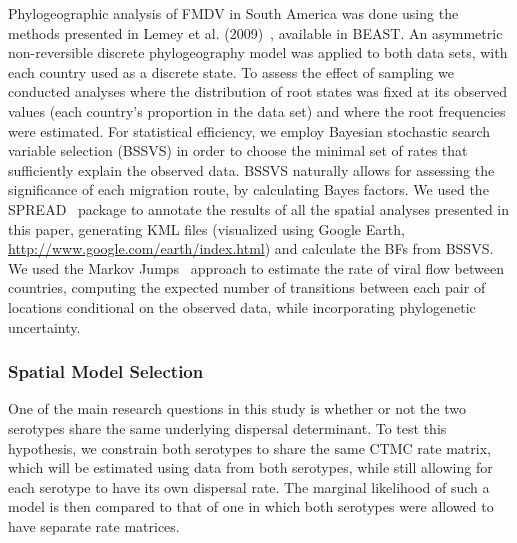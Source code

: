 \documentclass[10pt]{article}
\begin{document}
Phylogeographic analysis of FMDV in South America was done using the methods presented in Lemey et al. (2009)~\cite{roots}, available in BEAST. 
An asymmetric non-reversible discrete phylogeography model was applied to both data sets, with each country used as a discrete state.
To assess the effect of sampling we conducted analyses where the distribution of root states was fixed at its observed values (each country's proportion in the data set) and where the root frequencies were estimated.
For statistical efficiency, we employ Bayesian stochastic search variable selection (BSSVS) in order to choose the minimal set of rates that sufficiently explain the observed data.
BSSVS naturally allows for assessing the significance of each migration route, by calculating Bayes factors.
We used the SPREAD~\cite{spread} package to annotate the results of all the spatial analyses presented in this paper, generating KML files (visualized using Google Earth, \url{http://www.google.com/earth/index.html}) and calculate the BFs from BSSVS.
We used the Markov Jumps~\cite{Minin2008} approach to estimate the rate of viral flow between countries, computing the expected number of transitions between each pair of locations conditional on the observed data, while incorporating phylogenetic uncertainty.

\subsubsection*{Spatial Model Selection}

One of the main research questions in this study is whether or not the two serotypes share the same underlying dispersal determinant. 
To test this hypothesis, we constrain both serotypes to share the same CTMC rate matrix, which will be estimated using data from both serotypes, while still allowing for each serotype to have its own dispersal rate.
The marginal likelihood of such a model is then compared to that of one in which both serotypes were allowed to have separate rate matrices.
\end{document}
